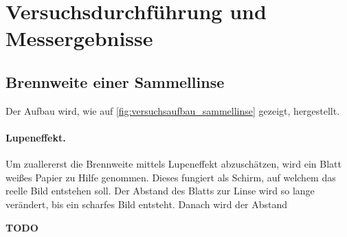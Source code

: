 \documentclass[ngerman]{scrartcl}
\begin{document}
\section{Versuchsdurchführung und Messergebnisse}
\label{sec:versuchsdurchfuehrung_messergebnisse}

\subsection{Brennweite einer Sammellinse}
\label{subsec:durchfuehrung_brennweite_sammellinse}

Der Aufbau wird, wie auf \autoref{fig:versuchsaufbau_sammellinse} gezeigt, hergestellt.

\paragraph{Lupeneffekt.}
Um zuallererst die Brennweite mittels Lupeneffekt abzuschätzen, wird ein Blatt weißes Papier zu Hilfe genommen. Dieses fungiert als Schirm, auf welchem das reelle Bild entstehen soll. Der Abstand des Blatts zur Linse wird so lange verändert, bis ein scharfes Bild entsteht. Danach wird der Abstand

\textbf{TODO}
\end{document}
